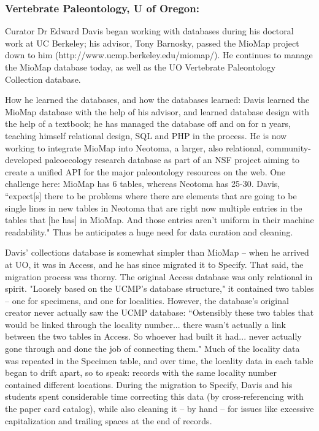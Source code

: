 \subsubsection{Vertebrate Paleontology, U of Oregon:}

Curator Dr Edward Davis began working with databases during his doctoral work at UC Berkeley; his advisor, Tony Barnosky, passed the MioMap project down to him (http://www.ucmp.berkeley.edu/miomap/).  He continues to manage the MioMap database today, as well as the UO Vertebrate Paleontology Collection database.

How he learned the databases, and how the databases learned: Davis learned the MioMap database with the help of his advisor, and learned database design with the help of a textbook; he has managed the database off and on for n years, teaching himself relational design, SQL and PHP in the process.  He is now working to integrate MioMap into Neotoma, a larger, also relational, community-developed paleoecology research database as part of an NSF project aiming to create a unified API for the major paleontology resources on the web.  One challenge here: MioMap has 6 tables, whereas Neotoma has 25-30. Davis, “expect[s] there to be problems where there are elements that are going to be single lines in new tables in Neotoma that are right now multiple entries in the tables that [he has] in MioMap. And those entries aren't uniform in their machine readability."  Thus he anticipates a huge need for data curation and cleaning.

Davis’ collections database is somewhat simpler than MioMap – when he arrived at UO, it was in Access, and he has since migrated it to Specify.  That said, the migration process was thorny.  The original Access database was only relational in spirit.  "Loosely based on the UCMP's database structure," it contained two tables – one for specimens, and one for localities. However, the database’s original creator never actually saw the UCMP database:
“Ostensibly these two tables that would be linked through the locality number... there wasn't actually a link between the two tables in Access. So whoever had built it had... never actually gone through and done the job of connecting them."
Much of the locality data was repeated in the Specimen table, and over time, the locality data in each table began to drift apart, so to speak: records with the same locality number contained different locations.  During the migration to Specify, Davis and his students spent considerable time correcting this data (by cross-referencing with the paper card catalog), while also cleaning it – by hand – for issues like excessive capitalization and trailing spaces at the end of records.  

